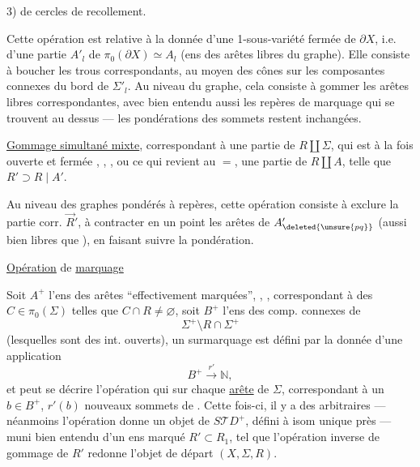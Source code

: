 3)   de cercles de recollement.

Cette opération est relative à la donnée d'une 1-sous-variété fermée de $\partial X$, i.e. d'une partie $A'_l$ de $\pi_0(\partial X)\simeq A_l$ (ens des arêtes libres du graphe).
Elle consiste à boucher les trous correspondants, au moyen des cônes sur les composantes connexes du bord de $\Sigma'_l$.
Au niveau du graphe, cela consiste à gommer les arêtes libres correspondantes, avec bien entendu aussi les repères de marquage qui se trouvent au dessus ---  les pondérations des sommets restent inchangées.

\uline{Gommage simultané mixte},  correspondant à une partie
   de $R\amalg\Sigma$,
qui est à la fois ouverte et fermée 
,
,
,
ou ce qui revient au $=$, une partie  de $R\amalg A$, telle que $R'\supset R\mid A'$.

Au niveau des graphes pondérés à repères, cette opération consiste à exclure   la partie corr. $\vec R'$, à contracter en un point les arêtes de $A'_{\deleted{\unsure{pq}}}$ (aussi bien libres que ), en faisant suivre la pondération.

 
\uline{Opération} de  \uline{marquage}

Soit $A^+$ l'ens des arêtes  ``effectivement marquées'', ,
,
correspondant à des $C\in\pi_0(\Sigma)$ telles que $C\cap R\ne\varnothing$, soit $B^+$ l'ens des comp. connexes de
\[
 \Sigma^+\setminus R\cap\Sigma^+
\]
(lesquelles sont des int. ouverts), un surmarquage est défini par la donnée d'une application
\[
 B^+\xrightarrow{r'}\mathbb N,
\]
et peut se décrire   l'opération qui sur chaque
\uline{arête} 
de $\Sigma$, correspondant à un $b\in B^+$, $r'(b)$ nouveaux sommets de  .
Cette fois-ci,  il y a des  arbitraires --- néanmoins l'opération donne un objet de $S\mathcal TD^+$, défini à isom unique près  --- muni bien entendu d'un ens marqué $R'\subset R_1$, tel que l'opération inverse de gommage de $R'$ redonne l'objet de départ $(X,\Sigma,R)$.


